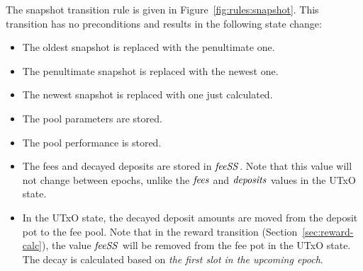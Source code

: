 The snapshot transition rule is given in Figure~\ref{fig:rules:snapshot}.
This transition has no preconditions and results in the following state change:

\begin{itemize}
  \item The oldest snapshot is replaced with the penultimate one.
  \item The penultimate snapshot is replaced with the newest one.
  \item The newest snapshot is replaced with one just calculated.
  \item The pool parameters are stored.
  \item The pool performance is stored.
  \item The fees and decayed deposits are stored in $\mathit{feeSS}$. Note that this value will not
    change between epochs, unlike the $\mathit{fees}$ and $\mathit{deposits}$ values in the UTxO state.
  \item In the UTxO state, the decayed deposit amounts are moved from the deposit pot
    to the fee pool. Note that in the reward transition (Section~\ref{sec:reward-calc}),
    the value $\mathit{feeSS}$ will be removed from the fee pot in the UTxO state.
    The decay is calculated based on \textit{the first slot in the upcoming epoch}.
\end{itemize}

